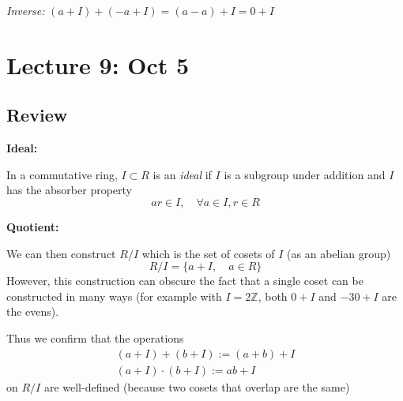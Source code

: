 \documentclass[12pt]{report}
\newcommand{\Z}{\mathbb{Z}}
\begin{document}
\emph{Inverse:} $(a + I) + (-a + I) = (a - a) + I = 0 + I$ 
\section*{Lecture 9: Oct 5}
\subsection*{Review}
\textbf{Ideal:}

In a commutative ring, $I \subset R$ is an \emph{ideal} if $I$ is a subgroup under addition and $I$ has the absorber property 
\[ar \in I, \quad \forall a\in I, r \in R\]

\vspace*{0.25 in}

\textbf{Quotient:}

We can then construct $R/I$ which is the set of cosets of $I$ (as an abelian group)
\[R/I = \{a + I, \quad a \in R\}\]
However, this construction can obscure the fact that a single coset can be constructed in many ways (for example with $I = 2\Z$, both $0 + I$ and $-30 + I$ are the evens).

Thus we confirm that the operations 
\begin{align*}
    (a + I) + (b + I) := (a + b) +I\\
    (a + I) \cdot (b + I) := ab + I
\end{align*}
on $R/I$ are well-defined (because two cosets that overlap are the same)
\end{document}
